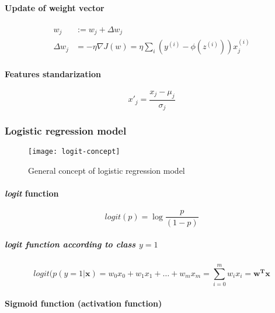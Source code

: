 \documentclass{article}
\begin{document}
			\paragraph{Update of weight vector}

			\begin{align}
					w_j &:= w_j + \Delta w_j \\
					\Delta w_j &= -\eta\nabla J(w) = \eta\sum_i (y^{(i)} -\phi(z^{(i)}))x^{(i)}_j
			\end{align}

			\paragraph{Features standarization}

			\begin{equation}
				x'_j = \frac{x_j - \mu_j}{\sigma_j}
			\end{equation}
			
			\subsubsection{Logistic regression model}

			\begin{figure}
				\centering
				\texttt{[image: logit-concept]}
				\caption{General concept of logistic regression model}
				\label{fig:logit-concept}
			\end{figure}
			
			\paragraph{\textit{logit} function}
			
			\begin{equation}
				logit(p) = \log \frac{p}{(1-p)}
			\end{equation}
			
			\subparagraph{\textit{logit} function according to class $y = 1$}
			
			\begin{equation}
				logit(p(y=1|\boldsymbol{x}) = w_0 x_0 + w_1 x_1 + \dots + w_m x_m = \sum_{i=0}^m w_i x_i = \boldsymbol{w^T x}
			\end{equation}
			
			\paragraph{Sigmoid function (activation function)}
\end{document}
